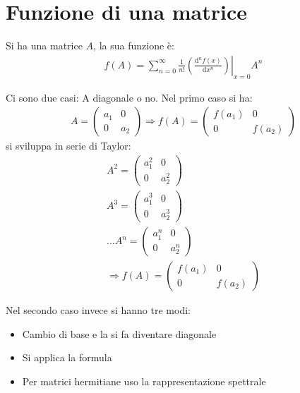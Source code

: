 \chapter{Funzione di una matrice} %
Si ha una matrice $A$, la sua funzione è:
\begin{equation}\begin{split}
f\left(A\right)=\left.\sum_{n=0}^{\infty }\frac{1}{n!}\left(\frac{\textrm{d}^nf\left(x\right)}{\textrm{d}x^n}\right)\right|_{x=0}A^n
\end{split}\end{equation}

Ci sono due casi: A diagonale o no. Nel primo caso si ha:
\begin{equation}\begin{split}
A=\left(\begin{matrix}a_1&0\\0&a_2\end{matrix}\right)\Longrightarrow f\left(A\right)=\left(\begin{matrix}f\left(a_1\right)&0\\0&f\left(a_2\right)\end{matrix}\right)
\end{split}\end{equation}
si sviluppa in serie di Taylor:
\begin{equation}\begin{split}
A^2=\left(\begin{matrix}a^2_1&0\\0&a^2_2\end{matrix}\right)\\
A^3=\left(\begin{matrix}a^3_1&0\\0&a^3_2\end{matrix}\right)\\
\dots A^n=\left(\begin{matrix}a^n_1&0\\0&a^n_2\end{matrix}\right)\\
\Longrightarrow f\left(A\right)=\left(\begin{matrix}f\left(a_1\right)&0\\0&f\left(a_2\right)\end{matrix}\right)
\end{split}\end{equation}

Nel secondo caso invece si hanno tre modi:
\begin{itemize}
\item Cambio di base e la si fa diventare diagonale
\item Si applica la formula
\item Per matrici hermitiane uso la rappresentazione spettrale
\end{itemize}


